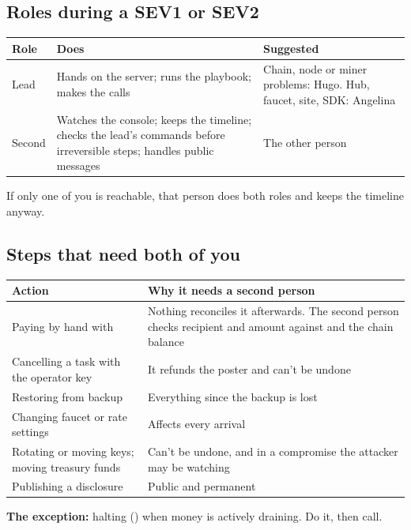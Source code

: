 \documentclass[11pt]{article}
\begin{document}
\subsection{Roles during a SEV1 or SEV2}

\begingroup\small
\begin{longtable}{@{}L{1.8cm}L{7.4cm}L{6.4cm}@{}}
\toprule
\textbf{Role} & \textbf{Does} & \textbf{Suggested} \\
\midrule
\endhead
Lead & Hands on the server; runs the playbook; makes the calls & Chain, node or miner problems: Hugo. Hub, faucet, site, SDK: Angelina \\
Second & Watches the console; keeps the timeline; checks the lead's commands before irreversible steps; handles public messages & The other person \\
\bottomrule
\end{longtable}
\endgroup

If only one of you is reachable, that person does both roles and keeps the timeline anyway.

\subsection{Steps that need both of you}

\begingroup\small
\begin{longtable}{@{}L{5.6cm}L{10cm}@{}}
\toprule
\textbf{Action} & \textbf{Why it needs a second person} \\
\midrule
\endhead
Paying by hand with  & Nothing reconciles it afterwards. The second person checks recipient and amount against  and the chain balance \\
Cancelling a task with the operator key & It refunds the poster and can't be undone \\
Restoring from backup & Everything since the backup is lost \\
Changing faucet or rate settings & Affects every arrival \\
Rotating or moving keys; moving treasury funds & Can't be undone, and in a compromise the attacker may be watching \\
Publishing a disclosure & Public and permanent \\
\bottomrule
\end{longtable}
\endgroup

\textbf{The exception:} halting () when money is actively draining. Do it, then call.
\end{document}
